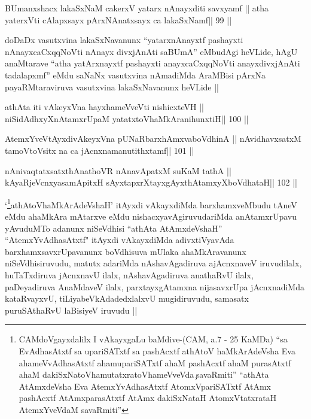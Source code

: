 \begin{shl}
BUmanxshacx lakaSxNaM cakerxV yatarx nAnayxditi savxyamf ||
atha yaterxVti cAlapxsayx pArxNAnatxsayx ca lakaSxNamf\hfill || 99 ||
\end{shl}

\begin{artha}
doDaDx vasutxvina lakaSxNavanunx ``\footnotemark[1]yatarxnAnayxtf 
pashayxti nAnayxcaCxqqNoVti nAnayx divxjAnAti saBUmA'' eMbudAgi
heVLide, hAgU anaMtarave ``\footnotemark[1]atha yatArxnayxtf pashayxti
anayxcaCxqqNoVti anayxdivxjAnAti tadalapxmf'' eMdu saNaNx vasutxvina
nAmadiMda AraMBisi pArxNa payaRMtaraviruva vasutxvina lakaSxNavanunx
heVLide || 
\end{artha}


\begin{shl}
athAta iti vAkeyxVna hayxhameVveVti nishicxteVH ||
niSidAdhxyXnAtamxrUpaM yatatxtoV\s haMkAranihunxtiH\hfill || 100 ||
\end{shl}

\begin{shl}
AtemxYveVtAyxdivAkeyxVna pUNaRbarxhAmxvaboVdhinA ||
nAvidhavxsatxM tamoV\s toV\s sitx na ca jAcnxnamanutithxtamf\hfill || 101 ||
\end{shl}

\begin{shl}
nAnivaqtatxsatxthA\s nathoVR nAnavApatxM suKaM tathA ||
kAyaRjeVcnxyasamApitxH sAyxtapxrXtayxgAyxthAtamxyXboVdhataH\hfill || 102 ||
\end{shl}

\begin{artha}
`\footnote[1]{CAMdoVgayxdalilx I vAkayxgaLu baMdive-(CAM, a.7 - 25
    KaMDa) ``sa EvAdhasAtxtf sa upariSATxtf sa pashAcxtf athAtoV\s
    haMkArAdeVsha Eva ahameVvAdhasAtxtf ahamupariSATxtf ahaM pashAcxtf
  ahaM purasAtxtf ahaM dakiSxNatoV\s hamutatxratoV\s hameVveVda\c\ savaRmiti'' ``athAta AtAmxdeVsha Eva AtemxYvAdhasAtxtf
  AtomxVpariSATxtf AtAmx pashAcxtf AtAmxparasAtxtf AtAmx dakiSxNataH
  AtomxVtatxrataH AtemxYveVdaM savaRmiti''}athAtoV\s haMkArAdeVshaH' 
  itAyxdi vAkayxdiMda barxhamxveMbudu tAneV eMdu ahaMkAra mAtarxve eMdu
  nishacxyavAgiruvudariMda anAtamxrUpavu yAvuduMTo adanunx niSeVdhisi
  ``athAta AtAmxdeVshaH'' ``AtemxYvAdhasAtxtf" itAyxdi vAkayxdiMda
  adivxtiVyavAda barxhamxsavxrUpavanunx boVdhisuva mUlaka
  ahaMkAravanunx niSeVdhisiruvudu, matutx adariMda nAshavAgadiruva
  ajAcnxnaveV iruvudilalx, huTaTxdiruva jAcnxnavU ilalx,
  nAshavAgadiruva anathaRvU ilalx, paDeyadiruva AnaMdaveV ilalx,
  parxtayxgAtamxna nijasavxrUpa jAcnxnadiMda kataRvayxvU,
  tiLiyabeVkAdadedxlalxvU mugidiruvudu, samasatx puruSAthaRvU laBisiyeV
  iruvudu ||
\end{artha}

